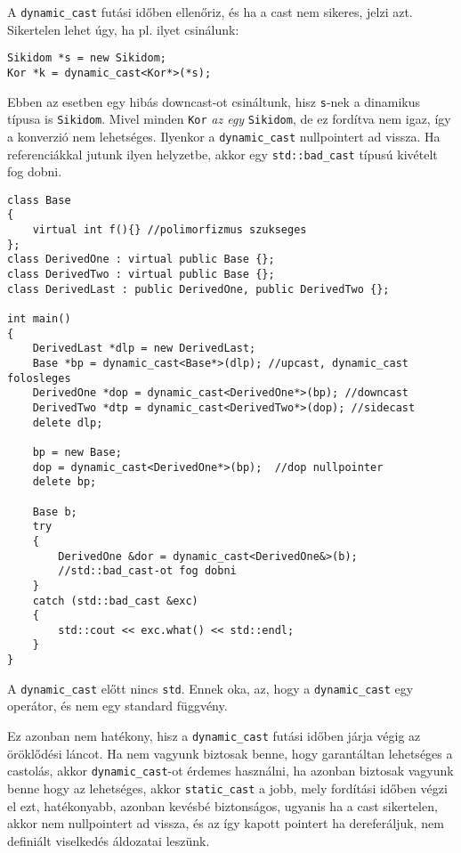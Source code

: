 \documentclass[a4paper,11.5pt,table]{article}
\begin{document}
	A \texttt{dynamic\_cast} futási időben ellenőriz, és ha a cast nem sikeres, jelzi azt. Sikertelen lehet úgy, ha pl. ilyet csinálunk:
	\begin{lstlisting}
Sikidom *s = new Sikidom;
Kor *k = dynamic_cast<Kor*>(*s);
	\end{lstlisting}
	Ebben az esetben egy hibás downcast-ot csináltunk, hisz \texttt{s}-nek a dinamikus típusa is \texttt{Sikidom}. Mivel minden \texttt{Kor} \textit{az egy} \texttt{Sikidom}, de ez fordítva nem igaz, így a konverzió nem lehetséges. Ilyenkor a \texttt{dynamic\_cast} nullpointert ad vissza. Ha referenciákkal jutunk ilyen helyzetbe, akkor egy \texttt{std::bad\_cast} típusú kivételt fog dobni.
	\begin{lstlisting}
class Base 
{
	virtual int f(){} //polimorfizmus szukseges
};
class DerivedOne : virtual public Base {};
class DerivedTwo : virtual public Base {};
class DerivedLast : public DerivedOne, public DerivedTwo {};

int main()
{
	DerivedLast *dlp = new DerivedLast;
	Base *bp = dynamic_cast<Base*>(dlp); //upcast, dynamic_cast folosleges
	DerivedOne *dop = dynamic_cast<DerivedOne*>(bp); //downcast
	DerivedTwo *dtp = dynamic_cast<DerivedTwo*>(dop); //sidecast
	delete dlp;
	
	bp = new Base;
	dop = dynamic_cast<DerivedOne*>(bp);  //dop nullpointer
	delete bp;
	
	Base b;
	try
	{
		DerivedOne &dor = dynamic_cast<DerivedOne&>(b); 
		//std::bad_cast-ot fog dobni
	}
	catch (std::bad_cast &exc)
	{
		std::cout << exc.what() << std::endl;
	}
}
	\end{lstlisting}	
	\begin{note}
		A \texttt{dynamic\_cast} előtt nincs \texttt{std}. Ennek oka, az, hogy a \texttt{dynamic\_cast} egy operátor, és nem egy standard függvény.
	\end{note}
	
	Ez azonban nem hatékony, hisz a \texttt{dynamic\_cast} futási időben járja végig az öröklődési láncot. Ha nem vagyunk biztosak benne, hogy garantáltan lehetséges a castolás, akkor \texttt{dynamic\_cast}-ot érdemes használni, ha azonban biztosak vagyunk benne hogy az lehetséges, akkor \texttt{static\_cast} a jobb, mely fordítási időben végzi el ezt, hatékonyabb, azonban kevésbé biztonságos, ugyanis ha a cast sikertelen, akkor nem nullpointert ad vissza, és az így kapott pointert ha dereferáljuk, nem definiált viselkedés áldozatai leszünk.
\end{document}
